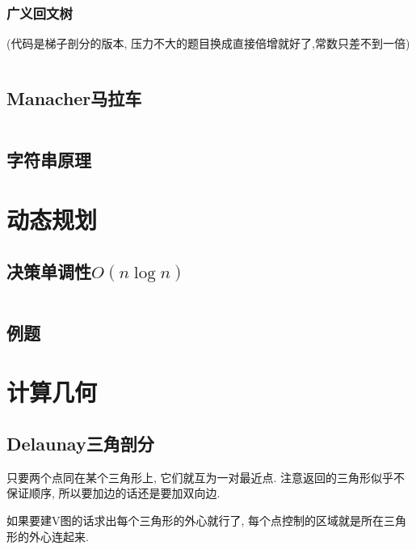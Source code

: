 \documentclass[a4paper, twoside]{article}
\begin{document}
\begin{multicols}{2}
				\subsubsection{广义回文树}
					(代码是梯子剖分的版本, 压力不大的题目换成直接倍增就好了,常数只差不到一倍)
					\inputminted{cpp}{../src/string/广义回文树.cpp}



			\subsection{Manacher马拉车}
				\inputminted{cpp}{../src/string/manacher.cpp}
			


			\subsection{字符串原理}
				

		\newpage
		\section{动态规划}
			\subsection{决策单调性$O(n\log n)$}
				\inputminted{cpp}{../src/dp/决策单调性.cpp}
			
			\subsection{例题}
				

		\newpage
		\section{计算几何}
		 	\subsection{Delaunay三角剖分}
				只要两个点同在某个三角形上, 它们就互为一对最近点. 注意返回的三角形似乎不保证顺序, 所以要加边的话还是要加双向边.
				
				如果要建V图的话求出每个三角形的外心就行了, 每个点控制的区域就是所在三角形的外心连起来.
				\inputminted{cpp}{../src/geometry/delaunay.cpp}
		
	\end{multicols}
			
\end{document}
